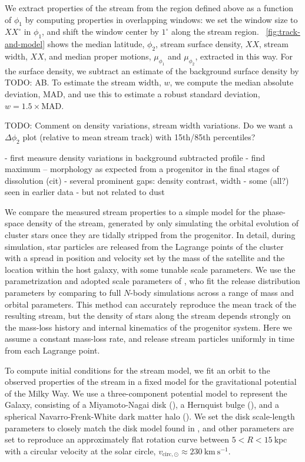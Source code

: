 \documentclass[modern]{aastex62}
\newcommand{\kpc}{\textrm{kpc}}
\newcommand{\kms}{\ensuremath{\textrm{km}~\textrm{s}^{-1}}}
\newcommand{\todo}[1]{{\color{red} TODO: #1}}
\begin{document}
We extract properties of the stream from the region defined above as a function
of $\phi_1$ by computing properties in overlapping windows:
we set the window size to $XX^\circ$ in $\phi_1$, and shift the window center by
$1^\circ$ along the stream region.
\figurename~\ref{fig:track-and-model} shows the median latitude, $\phi_2$,
stream surface density, $XX$, stream width, $XX$, and median proper motions,
$\mu_{\phi_1}$ and $\mu_{\phi_2}$, extracted in this way.
For the surface density, we subtract an estimate of the background surface
density by \todo{AB}.
To estimate the stream width, $w$, we compute the median absolute deviation,
$\textrm{MAD}$, and use this to estimate a robust standard deviation, $w = 1.5
\times \textrm{MAD}$.

\todo{Comment on density variations, stream width variations. Do we want a
$\Delta \phi_2$ plot (relative to mean stream track) with 15th/85th
percentiles?}

- first measure density variations in background subtracted profile
- find maximum -- morphology as expected from a progenitor in the final stages of dissolution (cit)
- several prominent gaps: density contrast, width
- some (all?) seen in earlier data
- but not related to dust

We compare the measured stream properties to a simple model for the phase-space
density of the stream, generated by only simulating the orbital evolution of
cluster stars once they are tidally stripped from the progenitor.
In detail, during simulation, star particles are released from the Lagrange
points of the cluster with a spread in position and velocity set by the mass of
the satellite and the location within the host galaxy, with some tunable scale
parameters.
We use the parametrization and adopted scale parameters of \citet{Fardal:2015},
who fit the release distribution parameters by comparing to full $N$-body
simulations across a range of mass and orbital parameters.
This method can accurately reproduce the mean track of the resulting stream, but
the density of stars along the stream depends strongly on the mass-loss history
and internal kinematics of the progenitor system.
Here we assume a constant mass-loss rate, and release stream particles uniformly
in time from each Lagrange point.

To compute initial conditions for the stream model, we fit an orbit to the
observed properties of the stream in a fixed model for the gravitational
potential of the Milky Way.
We use a three-component potential model to represent the Galaxy, consisting of
a Miyamoto-Nagai disk (\citealt{Miyamoto:1975}), a Hernquist bulge
(\citealt{Hernquist:1990}), and a spherical Navarro-Frenk-White dark matter halo
(\citealt{Navarro:1996}).
We set the disk scale-length parameters to closely match the disk model found in
\citet{Bovy:2015}, and other parameters are set to reproduce an approximately
flat rotation curve between $5 < R < 15~\kpc$ with a circular velocity at the
solar circle, $v_{\textrm{circ}, \odot} \approx 230~\kms$.
\end{document}
